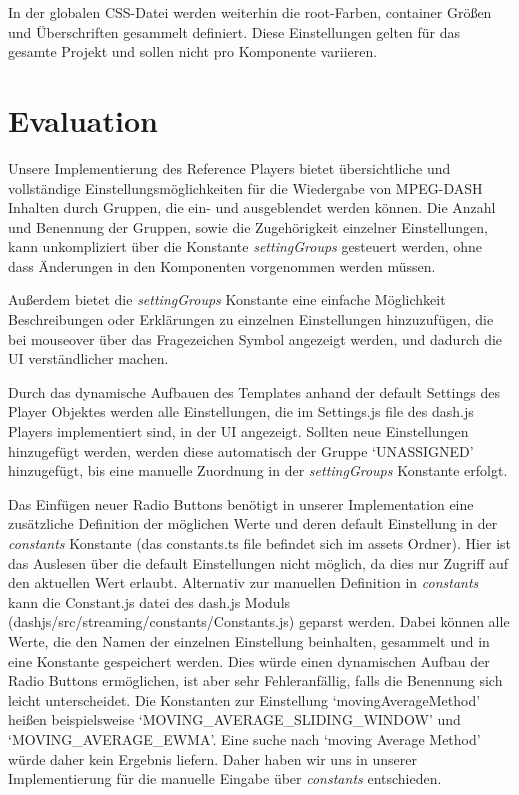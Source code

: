 \documentclass[conference]{IEEEtran}
\begin{document}
In der globalen CSS-Datei werden weiterhin die root-Farben, container Größen und Überschriften gesammelt definiert. Diese Einstellungen gelten für das gesamte Projekt und sollen nicht pro Komponente variieren.

\section{Evaluation}
Unsere Implementierung des Reference Players bietet übersichtliche und vollständige Einstellungsmöglichkeiten für die Wiedergabe von MPEG-DASH Inhalten durch Gruppen, die ein- und ausgeblendet werden können. Die Anzahl und Benennung der Gruppen, sowie die Zugehörigkeit einzelner Einstellungen, kann unkompliziert über die Konstante \textit{settingGroups} gesteuert werden, ohne dass Änderungen in den Komponenten vorgenommen werden müssen. 

Außerdem bietet die \textit{settingGroups} Konstante eine einfache Möglichkeit Beschreibungen oder Erklärungen zu einzelnen Einstellungen hinzuzufügen, die bei mouseover über das Fragezeichen Symbol angezeigt werden, und dadurch die UI verständlicher machen. 

Durch das dynamische Aufbauen des Templates anhand der default Settings des Player Objektes werden alle Einstellungen, die im Settings.js file des dash.js Players implementiert sind, in der UI angezeigt. Sollten neue Einstellungen hinzugefügt werden, werden diese automatisch der Gruppe ‘UNASSIGNED’ hinzugefügt, bis eine manuelle Zuordnung in der \textit{settingGroups} Konstante erfolgt. 

Das Einfügen neuer Radio Buttons benötigt in unserer Implementation eine zusätzliche Definition der möglichen Werte und deren default Einstellung in der \textit{constants} Konstante (das constants.ts file befindet sich im assets Ordner).
Hier ist das Auslesen über die default Einstellungen nicht möglich, da dies nur Zugriff auf den aktuellen Wert erlaubt. Alternativ zur manuellen Definition in \textit{constants} kann die Constant.js datei des dash.js Moduls (dashjs/src/streaming/constants/Constants.js) geparst werden. Dabei können alle Werte, die den Namen der einzelnen Einstellung beinhalten, gesammelt und in eine Konstante gespeichert werden. Dies würde einen dynamischen Aufbau der Radio Buttons ermöglichen, ist aber sehr Fehleranfällig, falls die Benennung sich leicht unterscheidet. Die Konstanten zur Einstellung ‘movingAverageMethod’ heißen beispielsweise ‘MOVING\_AVERAGE\_SLIDING\_WINDOW’ und ‘MOVING\_AVERAGE\_EWMA’. Eine suche nach ‘moving Average Method’ würde daher kein Ergebnis liefern. Daher haben wir uns in unserer Implementierung für die manuelle Eingabe über \textit{constants} entschieden.
\end{document}
